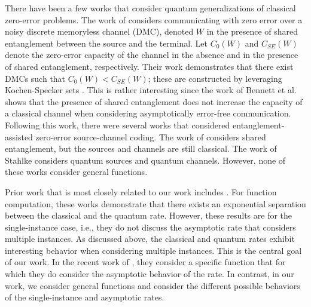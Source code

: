 \documentclass[journal, onecolumn, draftcls]{IEEEtran}
\theoremstyle{definition}
\newcommand{\meng}[1]{\marginpar{+}{\bf Ruoyu's remark}: {\em #1}}
\newcommand{\aditya}[1]{\marginpar{+}{\bf Aditya's remark}: {\em #1}}
\begin{document}


There have been a few works that consider quantum generalizations of classical zero-error problems. The work of \cite{cubitt2010improving} considers communicating with zero error over a noisy discrete memoryless channel (DMC), denoted $W$ in the presence of shared entanglement between the source and the terminal. Let $C_0(W)$ and $C_{SE}(W)$ denote the zero-error capacity of the channel in the absence and in the presence of shared entanglement, respectively. Their work demonstrates that there exist DMCs such that $C_0(W) < C_{SE}(W)$; these are constructed by leveraging Kochen-Specker sets \cite{held2009kochen}. This is rather interesting since the work of Bennett et al. \cite{bennett2002entanglement} shows that the presence of shared entanglement does not increase the capacity of a classical channel when considering asymptotically error-free communication. Following this work, there were several works that considered entanglement-assisted zero-error source-channel coding. The work of \cite{BrietBL_15} considers shared entanglement, but the sources and channels are still classical. The work of Stahlke \cite{stahlke2015quantum} considers quantum sources and quantum channels. However, none of these works consider general functions.%


Prior work that is most closely related to our work includes \cite{BuhrmanCW_98, GavinskyKKRd_07, Bar-YossefJK08}. For function computation, these works demonstrate that there exists an exponential separation between the classical and the quantum rate. However, these results are for the single-instance case, i.e., they do not discuss the asymptotic rate that considers multiple instances. As discussed above, the classical and quantum rates exhibit interesting behavior when considering multiple instances. This is the central goal of our work.  In the recent work of \cite{GuptaSXCA_23}, they consider a specific function that for which they do consider the asymptotic behavior of the rate. In contrast, in our work, we consider general functions and consider the different possible behaviors of the single-instance and asymptotic rates.
\end{document}
